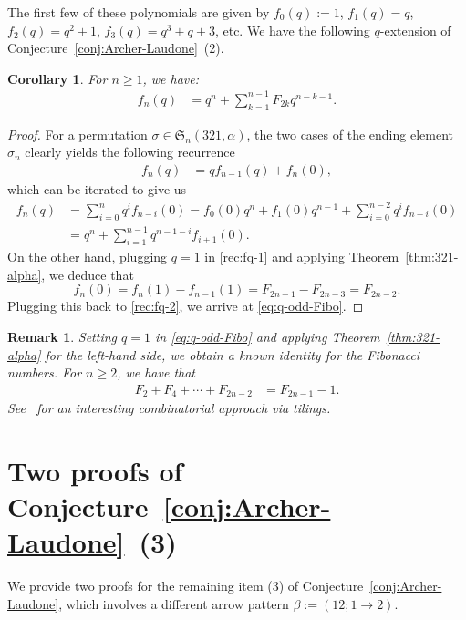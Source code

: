 \documentclass[12pt]{amsart}
\numberwithin{equation}{section}
\theoremstyle{plain}
\newtheorem{corollary}[theorem]{Corollary}
\newtheorem{remark}[theorem]{Remark}
\def\fS{\mathfrak{S}}
\begin{document}
	The first few of these polynomials are given by $f_0(q):=1$, $f_1(q)=q$, $f_2(q)=q^2+1$, $f_3(q)=q^3+q+3$, etc. We have the following $q$-extension of Conjecture~\ref{conj:Archer-Laudone}~(2).
	\begin{corollary}
		For $n\ge 1$, we have:
		\begin{align}\label{eq:q-odd-Fibo}
			f_n(q) &= q^{n}+\sum_{k=1}^{n-1}F_{2k}q^{n-k-1}.
		\end{align}
	\end{corollary}
	\begin{proof}
	For a permutation $\sigma\in\fS_n(321,\alpha)$, the two cases of the ending element $\sigma_n$ clearly yields the following recurrence
	\begin{align}\label{rec:fq-1}
		f_n(q) &= qf_{n-1}(q)+f_n(0),
	\end{align}
	which can be iterated to give us
	\begin{align}
		f_n(q) &= \sum_{i=0}^nq^{i}f_{n-i}(0)=f_0(0)q^n+f_1(0)q^{n-1}+\sum_{i=0}^{n-2}q^{i}f_{n-i}(0)\nonumber \\
		&= q^n+\sum_{i=1}^{n-1}q^{n-1-i}f_{i+1}(0).\label{rec:fq-2}
	\end{align}
	On the other hand, plugging $q=1$ in \eqref{rec:fq-1} and applying Theorem~\ref{thm:321-alpha}, we deduce that 
	$$f_n(0)=f_n(1)-f_{n-1}(1)=F_{2n-1}-F_{2n-3}=F_{2n-2}.$$
	Plugging this back to \eqref{rec:fq-2}, we arrive at \eqref{eq:q-odd-Fibo}.
	\end{proof}
	\begin{remark}
	Setting $q=1$ in \eqref{eq:q-odd-Fibo} and applying Theorem~\ref{thm:321-alpha} for the left-hand side, we obtain a known identity for the Fibonacci numbers. For $n\ge 2$, we have that
		\begin{align*}
			F_2+F_4+\cdots+F_{2n-2} &= F_{2n-1}-1.
		\end{align*}
	See~\cite[Id.~12]{BQ2003} for an interesting combinatorial approach via tilings.
	\end{remark}

\section{Two proofs of Conjecture~\ref{conj:Archer-Laudone}~(3)}\label{sec:beta}
We provide two proofs for the remaining item (3) of Conjecture~\ref{conj:Archer-Laudone}, which involves a different arrow pattern $\beta:=(12;1\to 2)$. 
\end{document}
